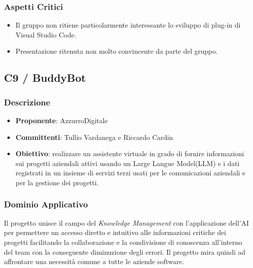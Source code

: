 \documentclass[a4paper, 12pt]{article}
\begin{document}
\subsubsection{Aspetti Critici}
\begin{itemize}
    \item Il gruppo non ritiene particolarmente interessante lo sviluppo di plug-in di Visual Studio Code.
    \item Presentazione ritenuta non molto convincente da parte del gruppo.
\end{itemize}



\subsection{C9 / BuddyBot}

\subsubsection{Descrizione}
\begin{itemize}
    \item \textbf{Proponente}: AzzurroDigitale
    \item \textbf{Committenti}: Tullio Vardanega e Riccardo Cardin
    \item \textbf{Obiettivo}: realizzare un assistente virtuale in grado di fornire informazioni sui progetti aziendali attivi usando un Large Langue Model(LLM) e i dati registrati in un insieme di servizi terzi usati per le comunicazioni aziendali e per la gestione dei progetti.
\end{itemize}

\subsubsection{Dominio Applicativo}
Il progetto unisce il campo del \textit{Knowledge Management} con l’applicazione dell’AI per permettere un accesso diretto e intuitivo alle informazioni critiche dei progetti facilitando la collaborazione e la condivisione di conoscenza all’interno del team con la conseguente diminuzione degli errori.
Il progetto mira quindi ad affrontare una necessità comune a tutte le aziende software.
\end{document}
